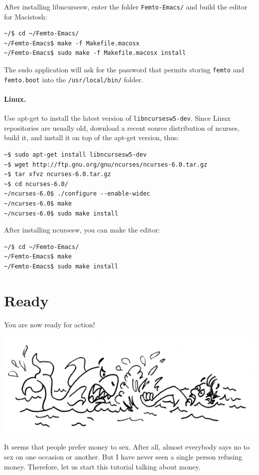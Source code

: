 \documentclass[a4paper,12pt]{book}
\begin{document}
After installing libncursesw, enter the folder \verb|Femto-Emacs/|
and build the editor for Macistosh:
\begin{verbatim}
~/$ cd ~/Femto-Emacs/ 
~/Femto-Emacs$ make -f Makefile.macosx
~/Femto-Emacs$ sudo make -f Makefile.macosx install
\end{verbatim}
The sudo application will ask for the password that
permits storing \verb|femto| and \verb|femto.boot|
into the \verb|/usr/local/bin/| folder.

\paragraph{Linux.} Use apt-get to install the
latest version of \verb|libncursesw5-dev|.
Since Linux repositories are usually old,
download a recent source distribution of ncurses,
build it, and install it on top of the
apt-get version, thus:
\begin{verbatim}
~$ sudo apt-get install libncursesw5-dev
~$ wget http://ftp.gnu.org/gnu/ncurses/ncurses-6.0.tar.gz
~$ tar xfvz ncurses-6.0.tar.gz
~$ cd ncurses-6.0/
~/ncurses-6.0$ ./configure --enable-widec
~/ncurses-6.0$ make
~/ncurses-6.0$ sudo make install
\end{verbatim}
After installing ncursesw, you can make the editor:
\begin{verbatim}
~/$ cd ~/Femto-Emacs/ 
~/Femto-Emacs$ make
~/Femto-Emacs$ sudo make install 
\end{verbatim}


\section{Ready}
You are now ready for action!

\includegraphics{figs-prefix/readyforaction.jpg}

It seems that people prefer money to sex.
After all, almost everybody says no to
sex on one occasion or another.
But I have never seen a single
person refusing money. Therefore, let us
start this tutorial talking about money.
\end{document}
